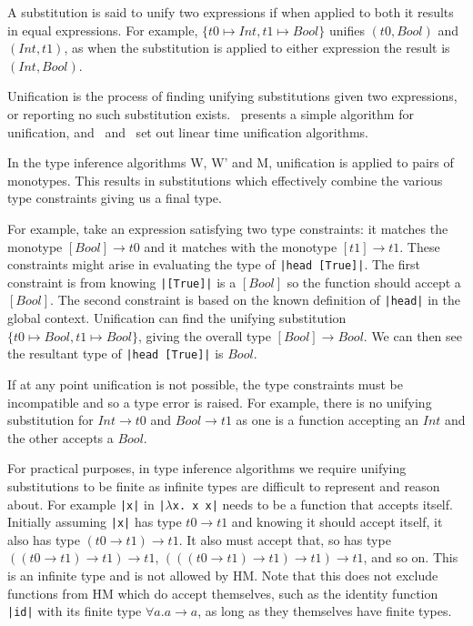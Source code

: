 \documentclass[a4paper,fleqn,twoside,12pt]{report}
\begin{document}
A substitution is said to unify two expressions if when applied to both it results in equal expressions. For example, $\{ t0 \mapsto Int, t1 \mapsto Bool \}$ unifies $(t0, Bool)$ and $(Int, t1)$, as when the substitution is applied to either expression the result is $(Int, Bool)$.

Unification is the process of finding unifying substitutions given two expressions, or reporting no such substitution exists.~\cite{ref29} presents a simple algorithm for unification, and~\cite{ref30} and~\cite{ref31} set out linear time unification algorithms.

In the type inference algorithms W, W’ and M, unification is applied to pairs of monotypes. This results in substitutions which effectively combine the various type constraints giving us a final type.

For example, take an expression satisfying two type constraints: it matches the monotype $[Bool] \rightarrow t0$ and it matches with the monotype $[t1] \rightarrow t1$. These constraints might arise in evaluating the type of \texttt{|head [True]|}. The first constraint is from knowing \texttt{|[True]|} is a $[Bool]$ so the function should accept a $[Bool]$. The second constraint is based on the known definition of \texttt{|head|} in the global context. Unification can find the unifying substitution $\{ t0 \mapsto Bool, t1 \mapsto Bool \}$, giving the overall type $[Bool] \rightarrow Bool$. We can then see the resultant type of \texttt{|head [True]|} is $Bool$.

If at any point unification is not possible, the type constraints must be incompatible and so a type error is raised. For example, there is no unifying substitution for $Int \rightarrow t0$ and $Bool \rightarrow t1$ as one is a function accepting an $Int$ and the other accepts a $Bool$.

For practical purposes, in type inference algorithms we require unifying substitutions to be finite as infinite types are difficult to represent and reason about. For example \texttt{|x|} in \texttt{|$\lambda$x. x x|} needs to be a function that accepts itself. Initially assuming \texttt{|x|} has type $t0 \rightarrow t1$ and knowing it should accept itself, it also has type $(t0 \rightarrow t1) \rightarrow t1$. It also must accept that, so has type $((t0 \rightarrow t1) \rightarrow t1) \rightarrow t1$, $(((t0 \rightarrow t1) \rightarrow t1) \rightarrow t1) \rightarrow t1$, and so on. This is an infinite type and is not allowed by HM. Note that this does not exclude functions from HM which do accept themselves, such as the identity function \texttt{|id|} with its finite type $\forall a. a \rightarrow a$, as long as they themselves have finite types.
\end{document}
